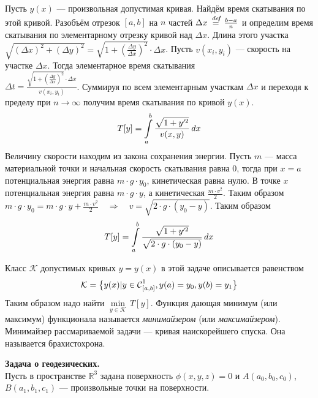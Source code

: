 \documentclass[12pt,a4paper,openany,fleqn]{book}
\newcommand {\defeq}{\stackrel{\hspace{0.09 cm}de\!f}{=}}
\newcommand {\eqdef}{\defeq}
\newcommand{\Cf}{\ensuremath{\mathcal{C}}}
\newcommand{\mc}[1]{\ensuremath{\mathcal{#1}}}
\newcommand{\Cfn}[2][]{\ensuremath{\Cf{\mathstrut}^{#2}_{#1}}}
\theoremstyle{definition}
\begin{document}
\begin{enumerate2}
	Пусть $y(x)$ --- произвольная допустимая кривая. Найдём время скатывания по этой кривой. Разобъём отрезок ${[a,b]}$ на $n$ частей $\Delta x\eqdef\frac{b-a}{n}$ и определим время скатывания по элементарному отрезку кривой над $\Delta x$. Длина этого участка $\sqrt{(\Delta x)^2+(\Delta y)^2}=\sqrt{1+\left(\frac{\Delta y}{\Delta x}\right)^2}\cdot \Delta x$. Пусть $v(x_i, y_i)$ --- скорость на участке $\Delta x$. Тогда элементарное время скатывания \\
	$\Delta t= \displaystyle \frac{\sqrt{1+\left(\frac{\Delta y}{\Delta x}\right)^2}\cdot \Delta x}{v(x_i, y_i)}$. Суммируя по всем элементарным участкам $\Delta x$ и переходя к пределу при $n\to\infty$ получим время скатывания по кривой $y(x)$.
	\begin{equation*}
		 \hfill T[y]=\int\limits_a^b\frac{\sqrt{1+y^{\prime 2}}}{v(x,y)}\,dx\hfill
	\end{equation*}
	Величину скорости находим из закона сохранения энергии. Пусть $m$ --- масса материальной точки и начальная скорость скатывания равна 0, тогда при $x=a$ потенциальная энергия равна $m\cdot g\cdot y_0$, кинетическая равна нулю. В точке $x$ потенциальная энергия равна $m\cdot g\cdot y$, а кинетическая $\frac{m\cdot v^2}{2}$. Таким образом
	$m\cdot g\cdot y_0=m\cdot g\cdot y+\frac{m\cdot v^2}{2}\quad\Rightarrow \quad v=\sqrt{2\cdot g\cdot(y_0-y)}$. Таким образом  
	\begin{equation*}
		\hfill T[y]=\int\limits_a^b\frac{\sqrt{1+y^{\prime 2}}}{\sqrt{2\cdot g\cdot(y_0-y)}}\,dx\hfill
	\end{equation*}
	
	Класс $\mc{K}$ допустимых кривых $y=y(x)$ в этой задаче описывается равенством 	
	\begin{equation*}
		\mc{K}=\big\{y(x)|y\in\Cfn[{[a,b]}]{1}, y(a)=y_0, y(b)=y_1\big\}
	\end{equation*}
Таким образом надо найти $\min\limits_{y\in\mc{K}}\,T[y]$. Функция дающая минимум (или максимум) функционала называется \emph{минимайзером} (или \emph{максимайзером}). Минимайзер рассмариваемой задачи --- кривая наискорейшего спуска. Она называется брахистохрона.

\item \textbf{Задача о геодезических.}\\
Пусть в пространстве $\mathbb{R}^3$ задана поверхность $\phi(x,y,z)=0$ и $A(a_0,b_0,c_0)$, $B(a_1,b_1,c_1)$ --- произвольные точки на поверхности.



\end{enumerate2}
\end{document}
